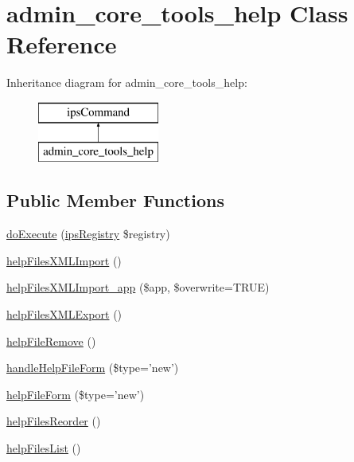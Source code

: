 \hypertarget{classadmin__core__tools__help}{\section{admin\-\_\-core\-\_\-tools\-\_\-help Class Reference}
\label{classadmin__core__tools__help}
}
Inheritance diagram for admin\-\_\-core\-\_\-tools\-\_\-help\-:\begin{figure}[H]
\begin{center}
\leavevmode
\includegraphics[height=2.000000cm]{classadmin__core__tools__help}
\end{center}
\end{figure}
\subsection*{Public Member Functions}
\begin{DoxyCompactItemize}
\item 
\hyperlink{classadmin__core__tools__help_afbc4e912a0604b94d47d66744c64d8ba}{do\-Execute} (\hyperlink{classips_registry}{ips\-Registry} \$registry)
\item 
\hyperlink{classadmin__core__tools__help_a4e75a46d73cb402de80ac151eaea1241}{help\-Files\-X\-M\-L\-Import} ()
\item 
\hyperlink{classadmin__core__tools__help_a10b4921ffda656e34660dd4698b447cc}{help\-Files\-X\-M\-L\-Import\-\_\-app} (\$app, \$overwrite=T\-R\-U\-E)
\item 
\hyperlink{classadmin__core__tools__help_a94c7e91479ef38d0a1018637d19b45f2}{help\-Files\-X\-M\-L\-Export} ()
\item 
\hyperlink{classadmin__core__tools__help_a47748af1d01eb3876ae5a1af5fa90d24}{help\-File\-Remove} ()
\item 
\hyperlink{classadmin__core__tools__help_a7cce9e19fb32cc67b572797bdee530f3}{handle\-Help\-File\-Form} (\$type='new')
\item 
\hyperlink{classadmin__core__tools__help_a6e2f632a274cf3037642dcba781aced8}{help\-File\-Form} (\$type='new')
\item 
\hyperlink{classadmin__core__tools__help_ae4c1675368ce3554b41edf9ea2c95422}{help\-Files\-Reorder} ()
\item 
\hyperlink{classadmin__core__tools__help_a28cf8b671d007c0747676a04bf064f5d}{help\-Files\-List} ()
\end{DoxyCompactItemize}
